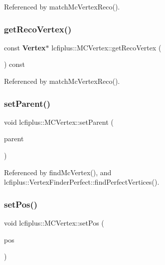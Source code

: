 Referenced by match\+Mc\+Vertex\+Reco().

\mbox{\label{classlcfiplus_1_1MCVertex_a9a53cb636961756ffc1d6ff9f00c9e02}} 
\subsubsection{get\+Reco\+Vertex()}
{\footnotesize\ttfamily const \textbf{ Vertex}$\ast$ lcfiplus\+::\+M\+C\+Vertex\+::get\+Reco\+Vertex (\begin{DoxyParamCaption}{ }\end{DoxyParamCaption}) const\hspace{0.3cm}{\ttfamily [inline]}}



Referenced by match\+Mc\+Vertex\+Reco().

\mbox{\label{classlcfiplus_1_1MCVertex_aa0e6b16e4f0380a4347fd132250e0fdb}} 
\subsubsection{set\+Parent()}
{\footnotesize\ttfamily void lcfiplus\+::\+M\+C\+Vertex\+::set\+Parent (\begin{DoxyParamCaption}\item[{const \textbf{ M\+C\+Particle} $\ast$}]{parent }\end{DoxyParamCaption})\hspace{0.3cm}{\ttfamily [inline]}}



Referenced by find\+Mc\+Vertex(), and lcfiplus\+::\+Vertex\+Finder\+Perfect\+::find\+Perfect\+Vertices().

\mbox{\label{classlcfiplus_1_1MCVertex_aa75079983c59944f205b9c6e3c42d3f5}} 
\subsubsection{set\+Pos()}
{\footnotesize\ttfamily void lcfiplus\+::\+M\+C\+Vertex\+::set\+Pos (\begin{DoxyParamCaption}\item[{const T\+Vector3 \&}]{pos }\end{DoxyParamCaption})\hspace{0.3cm}{\ttfamily [inline]}}



